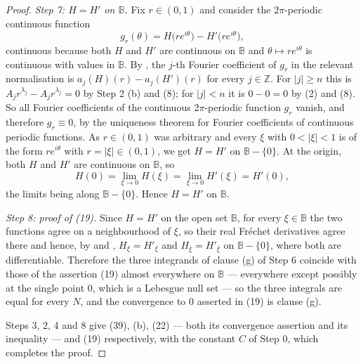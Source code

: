 \begin{proof}
\emph{Step 7: $H=H'$ on $\mathbb{B}$.}  Fix $r\in(0,1)$ and consider the
$2\pi$-periodic continuous function
\[
  g_r(\theta)=H\bigl(re^{i\theta}\bigr)-H'\bigl(re^{i\theta}\bigr),
\]
continuous because both $H$ and $H'$ are continuous on $\mathbb{B}$ and
$\theta\mapsto re^{i\theta}$ is continuous with values in $\mathbb{B}$.  By
, the $j$-th Fourier coefficient of $g_r$ in the
relevant normalisation is $a_j(H)(r)-a_j(H')(r)$ for every $j\in\mathbb{Z}$.
For $|j|\ge n$ this is $A_jr^{\lambda_j}-A_jr^{\lambda_j}=0$ by Step 2 (b) and
(8); for $|j|<n$ it is $0-0=0$ by (2) and (8).  So all Fourier coefficients of
the continuous $2\pi$-periodic function $g_r$ vanish, and therefore
$g_r\equiv0$, by the uniqueness theorem for Fourier coefficients of continuous
periodic functions.  As $r\in(0,1)$ was arbitrary and every $\xi$ with
$0<|\xi|<1$ is of the form $re^{i\theta}$ with $r=|\xi|\in(0,1)$, we get
$H=H'$ on $\mathbb{B}-\{0\}$.  At the origin, both $H$ and $H'$ are continuous
on $\mathbb{B}$, so
\[
  H(0)=\lim_{\xi\to0}H(\xi)=\lim_{\xi\to0}H'(\xi)=H'(0),
\]
the limits being along $\mathbb{B}-\{0\}$.  Hence $H=H'$ on $\mathbb{B}$.

\emph{Step 8: proof of (19).}  Since $H=H'$ on the open set $\mathbb{B}$, for
every $\xi\in\mathbb{B}$ the two functions agree on a neighbourhood of $\xi$,
so their real Fréchet derivatives agree there and hence, by  and
, $H_\xi=H'_\xi$ and $H_{\bar\xi}=H'_{\bar\xi}$ on
$\mathbb{B}-\{0\}$, where both are differentiable.  Therefore the three
integrands of clause (g) of Step 6 coincide with those of the assertion (19)
almost everywhere on $\mathbb{B}$ --- everywhere except possibly at the single
point $0$, which is a Lebesgue null set --- so the three integrals are equal
for every $N$, and the convergence to $0$ asserted in (19) is clause (g).

Steps 3, 2, 4 and 8 give (39), (b), (22) --- both its convergence assertion and
its inequality --- and (19) respectively, with the
constant $C$ of Step 0, which completes the proof.
\end{proof}
